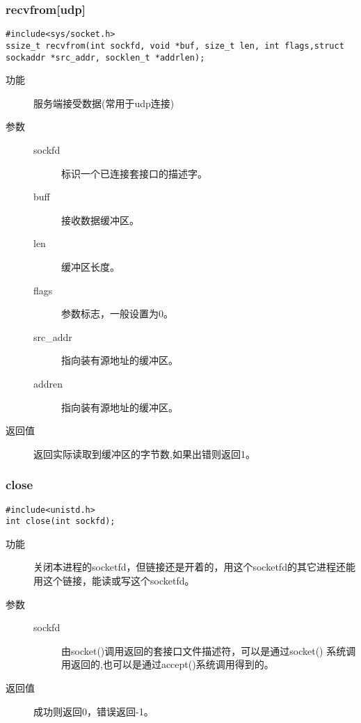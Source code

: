 \subsubsection{recvfrom[udp]}
\begin{lstlisting}[style=C]
#include<sys/socket.h>
ssize_t recvfrom(int sockfd, void *buf, size_t len, int flags,struct sockaddr *src_addr, socklen_t *addrlen);
\end{lstlisting}
\begin{description}
\item[功能]	服务端接受数据(常用于udp连接)
\item[参数]		 
\begin{description}
\item[sockfd]	标识一个已连接套接口的描述字。
\item[buff]		接收数据缓冲区。　
\item[len]		缓冲区长度。　
\item[flags]		参数标志，一般设置为0。
\item[src\_{}addr]	指向装有源地址的缓冲区。
\item[addren]	指向装有源地址的缓冲区。	
\end{description}
\item[返回值]		返回实际读取到缓冲区的字节数,如果出错则返回­1。
\end{description}


\subsubsection{close}
\begin{lstlisting}[style=C]
#include<unistd.h>
int close(int sockfd);
\end{lstlisting}
\begin{description}
\item[功能]	关闭本进程的socketfd，但链接还是开着的，用这个socketfd的其它进程还能用这个链接，能读或写这个socketfd。
\item[参数]		 
\begin{description}
\item[sockfd]	由socket()调用返回的套接口文件描述符，可以是通过socket()
系统调用返回的,也可以是通过accept()系统调用得到的。
\end{description}
\item[返回值]		成功则返回0，错误返回-1。
\end{description}


